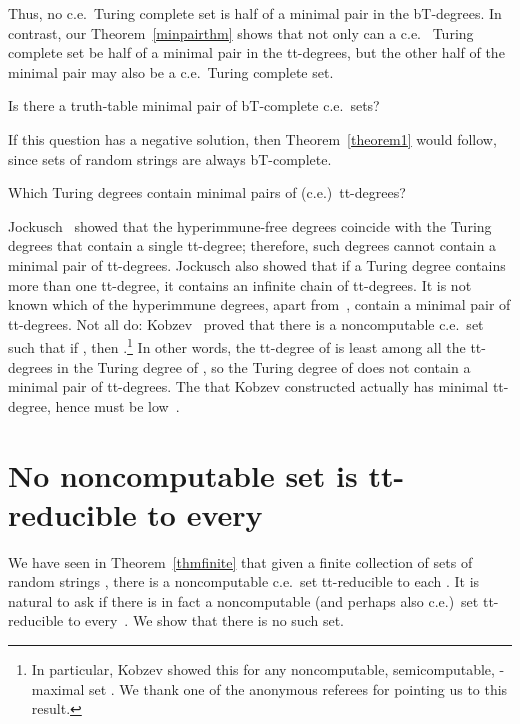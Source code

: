 \documentclass{LMCS}
\newcommand{\0}{\mathbf{0}}
\newcommand{\ce}{c.e.\ }
\newcommand{\<}{\langle}
\renewcommand{\>}{\rangle}
\begin{document}
Thus, no \ce Turing complete set is half of a minimal pair in the bT-degrees.
In contrast, our Theorem~\ref{minpairthm} shows that not only can a \ce
Turing complete set be half of a minimal pair in the tt-degrees, but the
other half of the minimal pair may also be a \ce Turing complete set.

\begin{qu}
Is there a truth-table minimal pair of bT-complete \ce sets?
\end{qu}

If this question has a negative solution, then Theorem~\ref{theorem1} would
follow, since sets of random strings are always bT-complete.

\begin{qu}
Which Turing degrees contain minimal pairs of (c.e.)\ tt-degrees?
\end{qu}

Jockusch~\cite{Jockusch} showed that the hyperimmune-free degrees coincide
with the Turing degrees that contain a single tt-degree; therefore, such
degrees cannot contain a minimal pair of tt-degrees. Jockusch also showed
that if a Turing degree contains more than one tt-degree, it contains an
infinite chain of tt-degrees. It is not known which of the hyperimmune
degrees, apart from~, contain a minimal pair of tt-degrees. Not all do:
Kobzev~\cite{Kobzev} proved that there is a noncomputable c.e.\ set  such
that if , then .\footnote{In particular,
Kobzev showed this for any noncomputable, semicomputable, -maximal set
. We thank one of the anonymous referees for pointing us to this result.}
In other words, the tt-degree of  is least among all the tt-degrees in the
Turing degree of , so the Turing degree of  does not contain a minimal
pair of tt-degrees. The  that Kobzev constructed actually has minimal
tt-degree, hence must be low~\cite{DS}.

\section{\texorpdfstring{No noncomputable set is tt-reducible to every
}{No noncomputable set is tt-reducible to every U-random set}}
\label{sec_X}

We have seen in Theorem~\ref{thmfinite} that given a finite collection of
sets of random strings , there is a
noncomputable \ce set tt-reducible to each .  It is natural to
ask if there is in fact a noncomputable (and perhaps also c.e.)\ set
tt-reducible to every~.  We show that there is no such set.
\end{document}
